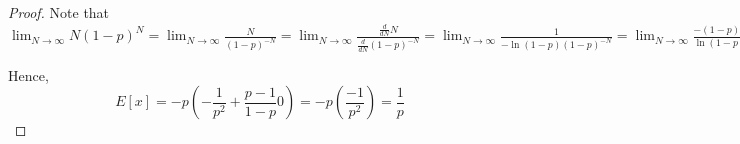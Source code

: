 \documentclass{report}
\begin{document}
\begin{proof}
Note that $\lim_{N \rightarrow \infty}N(1-p)^{N} = \lim_{N \rightarrow \infty}\frac{N}{(1-p)^{-N}} 
= \lim_{N \rightarrow \infty}\frac{\frac{d}{dN} N}{ \frac{d}{dN}(1-p)^{-N}} 
= \lim_{N \rightarrow \infty} \frac{1}{-\ln(1-p)(1-p)^{-N}}
= \lim_{N \rightarrow \infty}\frac{-(1-p)^{N}}{\ln(1-p)} = 0.$

Hence, $$E[x]  = -p \left( -\frac{1}{p^2} + \frac{p-1}{1-p}0\right) = -p\left(\frac{-1}{p^2}\right) = \frac{1}{p}$$

\end{proof}
\end{document}
